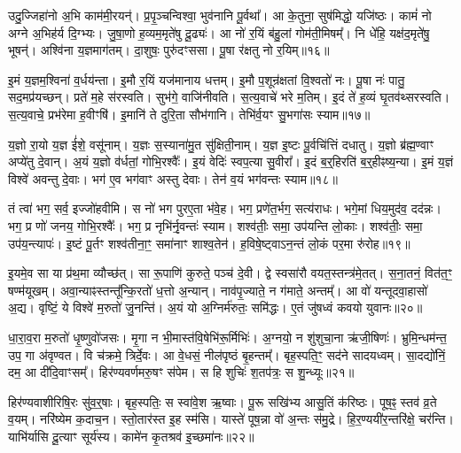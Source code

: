 उदु॒ज्जिहा॑नो अ॒भि काम॑मी॒रयन्॑।
प्र॒पृ॒ञ्चन्विश्वा॒ भुव॑नानि पू॒र्वथा᳚।
आ के॒तुना॒ सुष॑मिद्धो॒ यजि॑ष्ठः।
कामं॑ नो अग्ने अ॒भिह॑र्य दि॒ग्भ्यः।
जु॒षा॒णो ह॒व्यम॒मृते॑षु दू॒ढ्यः॑।
आ नो॑ र॒यिं ब॑हु॒लां गोम॑ती॒मिषम्᳚।
नि धे॑हि॒ यक्ष॑द॒मृते॑षु॒ भूषन्॑।
अश्वि॑ना य॒ज्ञमाग॑तम्।
दा॒शुषः॒ पुरु॑दꣳससा।
पू॒षा र॑क्षतु नो र॒यिम्॥१६॥

इ॒मं य॒ज्ञम॒श्विना॑ व॒र्धय॑न्ता।
इ॒मौ र॒यिं यज॑मानाय धत्तम्।
इ॒मौ प॒शून्र॑क्षतां वि॒श्वतो॑ नः।
पू॒षा नः॑ पातु॒ सद॒मप्र॑यच्छन्।
प्रते॑ म॒हे स॑रस्वति।
सुभ॑गे॒ वाजि॑नीवति।
स॒त्य॒वाचे॑ भरे म॒तिम्।
इ॒दं ते॑ ह॒व्यं घृ॒तव॑थ्सरस्वति।
स॒त्य॒वाचे॒ प्रभ॑रेमा ह॒वीꣳषि॑।
इ॒मानि॑ ते दुरि॒ता सौभ॑गानि।
तेभि॑र्व॒यꣳ सु॒भगा॑सः स्याम॥१७॥\anuvakamend[व॒ज्र्यही॑नामृजी॒षं व्यृ॑ण्वति रक्षतु नो र॒यिꣳ सौभ॑गा॒न्येकं॑ च]

य॒ज्ञो रा॒यो य॒ज्ञ ई॑शे॒ वसू॑नाम्।
य॒ज्ञः स॒स्याना॑मु॒त सु॑क्षिती॒नाम्।
य॒ज्ञ इ॒ष्टः पू॒र्वचि॑त्तिं दधातु।
य॒ज्ञो ब्र॑ह्म॒ण्वाꣳ अप्ये॑तु दे॒वान्।
अ॒यं य॒ज्ञो व॑र्धतां॒ गोभि॒रश्वैः᳚।
इ॒यं वेदिः॑ स्वप॒त्या सु॒वीरा᳚।
इ॒दं ब॒र्॒हिरति॑ ब॒र्॒हीꣴष्य॒न्या।
इ॒मं य॒ज्ञं विश्वे॑ अवन्तु दे॒वाः।
भग॑ ए॒व भग॑वाꣳ अस्तु देवाः।
तेन॑ व॒यं भग॑वन्तः स्याम॥१८॥

तं त्वा॑ भग॒ सर्व॒ इज्जो॑हवीमि।
स नो॑ भग पुरए॒ता भ॑वे॒ह।
भग॒ प्रणे॑त॒र्भग॒ सत्य॑राधः।
भगे॒मां धिय॒मुद॑व॒ दद॑न्नः।
भग॒ प्र णो॑ जनय॒ गोभि॒रश्वैः᳚।
भग॒ प्र नृभि॑र्नृ॒वन्तः॑ स्याम।
शश्व॑तीः॒ समा॒ उप॑यन्ति लो॒काः।
शश्व॑तीः॒ समा॒ उप॑य॒न्त्यापः॑।
इ॒ष्टं पू॒र्तꣳ शश्व॑तीना॒ꣳ॒ समा॑नाꣳ शाश्व॒तेन॑।
ह॒विषे॒ष्ट्वा\-ऽन॒न्तं लो॒कं पर॒मा रु॑रोह॥१९॥

इ॒यमे॒व सा या प्र॑थ॒मा व्यौच्छ॑त्।
सा रू॒पाणि॑ कुरुते॒ पञ्च॑ दे॒वी।
द्वे स्वसा॑रौ वयत॒स्तन्त्र॑मे॒तत्।
स॒ना॒तनं॒ वित॑त॒ꣳ॒ षण्म॑यूखम्।
अवा॒न्याꣴस्तन्तू᳚न्कि॒रतो॑ ध॒त्तो अ॒न्यान्।
नाव॑पृ॒ज्याते॒ न ग॑माते॒ अन्तम्᳚।
आ वो॑ यन्तूदवा॒हासो॑ अ॒द्य।
वृष्टिं॒ ये विश्वे॑ म॒रुतो॑ जु॒नन्ति॑।
अ॒यं यो अ॒ग्निर्म॑रुतः॒ समि॑द्धः।
ए॒तं जु॑षध्वं कवयो युवानः॥२०॥

धा॒रा॒व॒रा म॒रुतो॑ धृ॒ष्णुवो॑जसः।
मृ॒गा न भी॒मास्त॑वि॒षेभि॑\-रू॒र्मिभिः॑।
अ॒ग्नयो॒ न शु॑शुचा॒ना ऋ॑जी॒षिणः॑।
भ्रुमि॒न्धम॑न्त॒ उप॒ गा अ॑वृण्वत।
वि च॑क्रमे॒ त्रिर्दे॒वः।
आ वे॒धसं॒ नील॑पृष्ठं बृ॒हन्तम्᳚।
बृह॒स्पति॒ꣳ॒ सद॑ने सादयध्वम्।
सा॒दद्यो॑निं॒ दम॒ आ दी॑दि॒वाꣳसम्᳚।
हिर॑ण्यवर्णमरु॒षꣳ स॑पेम।
स हि शुचिः॑ श॒तप॑त्रः॒ स शु॒न्ध्यूः॥२१॥

हिर॑ण्यवाशीरिषि॒रः सु॑व॒र्॒षाः।
बृह॒स्पतिः॒ स स्वा॑वे॒श ऋ॒ष्वाः।
पू॒रू सखि॑भ्य आसु॒तिं क॑रिष्ठः।
पूष॒ꣴ॒ स्तव॑ व्र॒ते व॒यम्।
नरि॑ष्येम क॒दाच॒न।
स्तो॒तार॑स्त इ॒ह स्म॑सि।
यास्ते॑ पूष॒न्ना वो॑ अ॒न्तः स॑मु॒द्रे।
हि॒र॒ण्ययी॑र॒न्तरि॑क्षे॒ चर॑न्ति।
याभि॑र्यासि दू॒त्याꣳ सूर्य॑स्य।
कामे॑न कृ॒तश्रव॑ इ॒च्छमा॑नः॥२२॥

